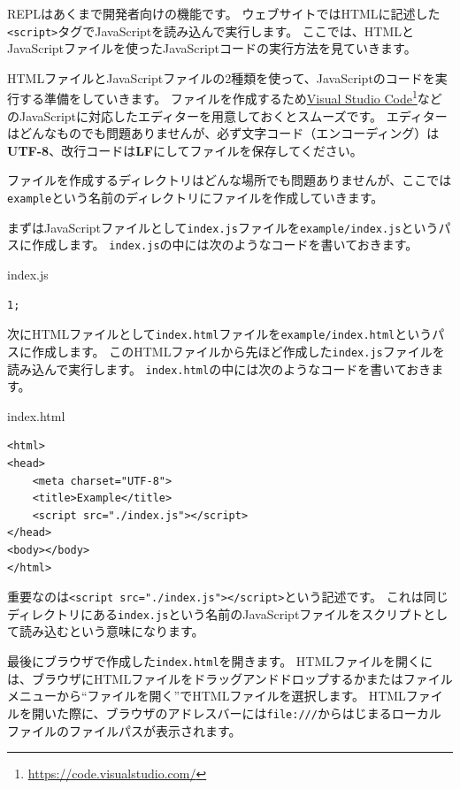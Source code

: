 REPLはあくまで開発者向けの機能です。
ウェブサイトではHTMLに記述した\texttt{<script>}タグでJavaScriptを読み込んで実行します。
ここでは、HTMLとJavaScriptファイルを使ったJavaScriptコードの実行方法を見ていきます。

\enlargethispage{\baselineskip}HTMLファイルとJavaScriptファイルの2種類を使って、JavaScriptのコードを実行する準備をしていきます。
ファイルを作成するため\href{https://code.visualstudio.com/}{Visual
Studio
Code}\footnote{\url{https://code.visualstudio.com/}}などのJavaScriptに対応したエディターを用意しておくとスムーズです。
エディターはどんなものでも問題ありませんが、必ず文字コード（エンコーディング）は\textbf{UTF-8}、改行コードは\textbf{LF}にしてファイルを保存してください。

ファイルを作成するディレクトリはどんな場所でも問題ありませんが、ここでは\texttt{example}という名前のディレクトリにファイルを作成していきます。

まずはJavaScriptファイルとして\texttt{index.js}ファイルを\texttt{example/index.js}というパスに作成します。
\texttt{index.js}の中には次のようなコードを書いておきます。

\begin{listtitle}
index.js
\end{listtitle}
\begin{lstlisting}
1;
\end{lstlisting}
\listend

次にHTMLファイルとして\texttt{index.html}ファイルを\texttt{example/index.html}というパスに作成します。
このHTMLファイルから先ほど作成した\texttt{index.js}ファイルを読み込んで実行します。
\texttt{index.html}の中には次のようなコードを書いておきます。

\begin{listtitle}
index.html
\end{listtitle}
\begin{lstlisting}
<html>
<head>
    <meta charset="UTF-8">
    <title>Example</title>
    <script src="./index.js"></script>
</head>
<body></body>
</html>
\end{lstlisting}
\listend

重要なのは\texttt{<script src="./index.js"></script>}という記述です。
これは同じディレクトリにある\texttt{index.js}という名前のJavaScriptファイルをスクリプトとして読み込むという意味になります。

最後にブラウザで作成した\texttt{index.html}を開きます。
HTMLファイルを開くには、ブラウザにHTMLファイルをドラッグアンドドロップするかまたはファイルメニューから``ファイルを開く''でHTMLファイルを選択します。
HTMLファイルを開いた際に、ブラウザのアドレスバーには\texttt{file:///}からはじまるローカルファイルのファイルパスが表示されます。

